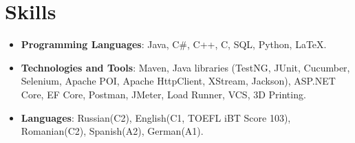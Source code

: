 \documentclass[letterpaper, 10.9pt]{article}
\newcommand{\resumeSubHeadingListStart}{\begin{itemize}[leftmargin=*]}
\newcommand{\resumeSubHeadingListEnd}{\end{itemize}}
\begin{document}
  \section{Skills}
\resumeSubHeadingListStart
	\item {\textbf{Programming Languages}{: Java, C\#, C++, C, SQL, Python, \LaTeX. }}
	\item {\textbf{Technologies and Tools}}{: Maven, Java libraries (TestNG, JUnit, Cucumber, Selenium, Apache POI, Apache HttpClient, XStream, Jackson), ASP.NET Core, EF Core, Postman, JMeter, Load Runner, VCS, 3D Printing.}
	\item {\textbf{Languages}{: Russian(C2), English(C1, TOEFL iBT Score 103), Romanian(C2), Spanish(A2), German(A1).}}
 \resumeSubHeadingListEnd
  
\end{document}
